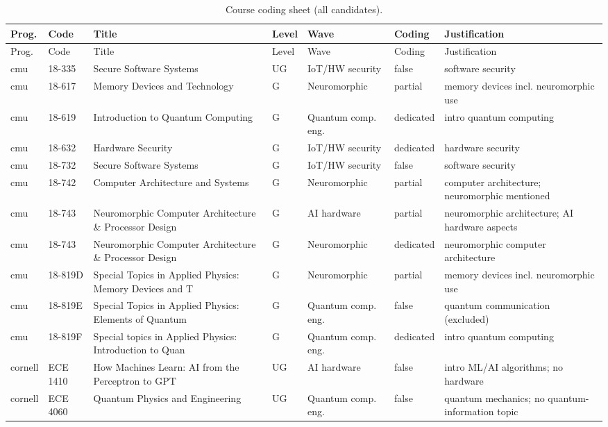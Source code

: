 \documentclass[10pt]{article}
\begin{document}
\begin{longtable}{@{}llL{4.6cm}llll@{}}
\caption{Course coding sheet (all candidates).}\label{tab:S7}\\
\toprule
Prog. & Code & Title & Level & Wave & Coding & Justification \\
\midrule
\endfirsthead
\toprule
Prog. & Code & Title & Level & Wave & Coding & Justification \\
\midrule
\endhead
\bottomrule
\endlastfoot
cmu & 18-335 & Secure Software Systems & UG & IoT/HW security & false & software security \\
cmu & 18-617 & Memory Devices and Technology & G & Neuromorphic & partial & memory devices incl. neuromorphic use \\
cmu & 18-619 & Introduction to Quantum Computing & G & Quantum comp. eng. & dedicated & intro quantum computing \\
cmu & 18-632 & Hardware Security & G & IoT/HW security & dedicated & hardware security \\
cmu & 18-732 & Secure Software Systems & G & IoT/HW security & false & software security \\
cmu & 18-742 & Computer Architecture and Systems & G & Neuromorphic & partial & computer architecture; neuromorphic mentioned \\
cmu & 18-743 & Neuromorphic Computer Architecture \& Processor Design & G & AI hardware & partial & neuromorphic architecture; AI hardware aspects \\
cmu & 18-743 & Neuromorphic Computer Architecture \& Processor Design & G & Neuromorphic & dedicated & neuromorphic computer architecture \\
cmu & 18-819D & Special Topics in Applied Physics: Memory Devices and T & G & Neuromorphic & partial & memory devices incl. neuromorphic use \\
cmu & 18-819E & Special Topics in Applied Physics: Elements of Quantum  & G & Quantum comp. eng. & false & quantum communication (excluded) \\
cmu & 18-819F & Special topics in Applied Physics: Introduction to Quan & G & Quantum comp. eng. & dedicated & intro quantum computing \\
cornell & ECE 1410 & How Machines Learn: AI from the Perceptron to GPT & UG & AI hardware & false & intro ML/AI algorithms; no hardware \\
cornell & ECE 4060 & Quantum Physics and Engineering & UG & Quantum comp. eng. & false & quantum mechanics; no quantum-information topic \\

\end{longtable}
\end{document}
